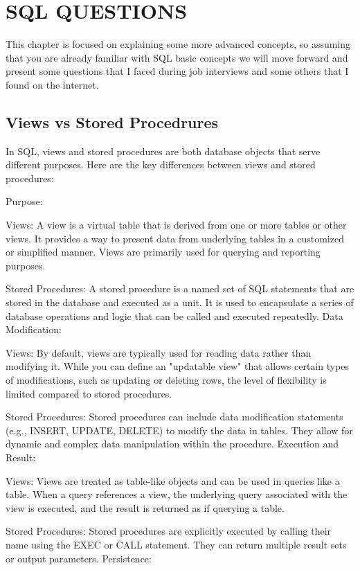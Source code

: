 \chapter{SQL QUESTIONS}

This chapter is focused on explaining some more advanced concepts, so assuming that you are already familiar with SQL basic concepts we will move forward and present some questions that I faced during job interviews and some others that I found on the internet.
\section{Views vs Stored Procedrures}

In SQL, views and stored procedures are both database objects that serve different purposes. Here are the key differences between views and stored procedures:

Purpose:

Views: A view is a virtual table that is derived from one or more tables or other views. It provides a way to present data from underlying tables in a customized or simplified manner. Views are primarily used for querying and reporting purposes.

Stored Procedures: A stored procedure is a named set of SQL statements that are stored in the database and executed as a unit. It is used to encapsulate a series of database operations and logic that can be called and executed repeatedly.
Data Modification:

Views: By default, views are typically used for reading data rather than modifying it. While you can define an "updatable view" that allows certain types of modifications, such as updating or deleting rows, the level of flexibility is limited compared to stored procedures.

Stored Procedures: Stored procedures can include data modification statements (e.g., INSERT, UPDATE, DELETE) to modify the data in tables. They allow for dynamic and complex data manipulation within the procedure.
Execution and Result:

Views: Views are treated as table-like objects and can be used in queries like a table. When a query references a view, the underlying query associated with the view is executed, and the result is returned as if querying a table.

Stored Procedures: Stored procedures are explicitly executed by calling their name using the EXEC or CALL statement. They can return multiple result sets or output parameters.
Persistence:

